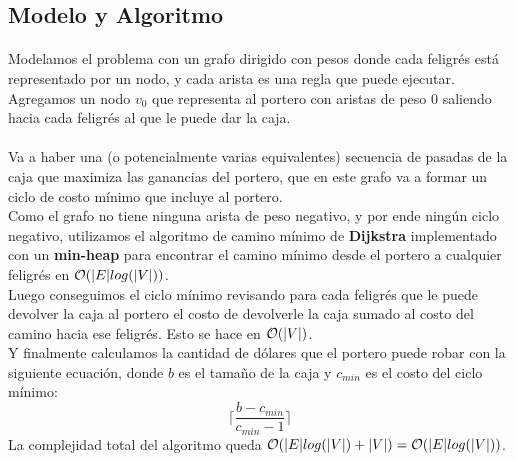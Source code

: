 \documentclass[../main.tex]{subfiles}
\begin{document}
\subsection{Modelo y Algoritmo}
\label{sec:ej3-model}
\paragraph{} Modelamos el problema con un grafo dirigido con pesos donde cada feligrés está representado por un nodo, y cada arista es una regla que puede ejecutar. Agregamos un nodo \(v_{0}\) que representa al portero con aristas de peso 0 saliendo hacia cada feligrés al que le puede dar la caja.

\paragraph{} Va a haber una (o potencialmente varias equivalentes) secuencia de pasadas de la caja que maximiza las ganancias del portero, que en este grafo va a formar un ciclo de costo mínimo que incluye al portero. \\
Como el grafo no tiene ninguna arista de peso negativo, y por ende ningún ciclo negativo, utilizamos el algoritmo de camino mínimo de \textbf{Dijkstra} implementado con un \textbf{min-heap} para encontrar el camino mínimo desde el portero a cualquier feligrés en \(\mathcal{O}(|E|log(|V|))\). \\
Luego conseguimos el ciclo mínimo revisando para cada feligrés que le puede devolver la caja al portero el costo de devolverle la caja sumado al costo del camino hacia ese feligrés. Esto se hace en \(\mathcal{O}(|V|)\). \\
Y finalmente calculamos la cantidad de dólares que el portero puede robar con la siguiente ecuación, donde \(b\) es el tamaño de la caja y \(c_{min}\) es el costo del ciclo mínimo: \\
\[
  \Big\lceil\dfrac{b - c_{min}}{c_{min}-1}\Big\rceil
  \]
La complejidad total del algoritmo queda \(\mathcal{O}(|E|log(|V|) + |V|) = \mathcal{O}(|E|log(|V|))\).
\end{document}
